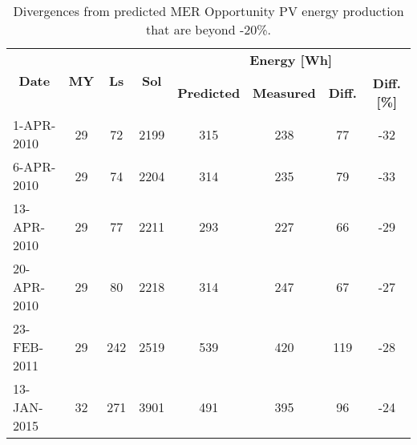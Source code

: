 \begin{table}[h]
    \centering
    \caption{Divergences from predicted MER Opportunity PV energy production that are beyond -20\%.}
    \label{tab:divergences-less-than-m20pc}
    \begin{tabular}{|l|c|c|c|c|c|c|c|}
    \hline
    \multicolumn{1}{|c|}{\multirow{2}{*}{\textbf{Date}}} & \multirow{2}{*}{\textbf{MY}} & \multirow{2}{*}{\textbf{Ls}} & \multirow{2}{*}{\textbf{Sol}} & \multicolumn{4}{c|}{\textbf{Energy [Wh]}} \\ \cline{5-8}
    \multicolumn{1}{|c|}{} &  &  &  & \textbf{Predicted} & \textbf{Measured} & \textbf{Diff.} & \textbf{Diff. [\%]} \\ \hline
    1-APR-2010 & 29 & 72 & 2199 & 315 & 238 & 77 & -32 \\
    6-APR-2010 & 29 & 74 & 2204 & 314 & 235 & 79 & -33 \\
    13-APR-2010 & 29 & 77 & 2211 & 293 & 227 & 66 & -29 \\
    20-APR-2010 & 29 & 80 & 2218 & 314 & 247 & 67 & -27 \\ \hline
    23-FEB-2011 & 29 & 242 & 2519 & 539 & 420 & 119 & -28 \\ \hline
    13-JAN-2015 & 32 & 271 & 3901 & 491 & 395 & 96 & -24 \\ \hline
    \end{tabular}
\end{table}
